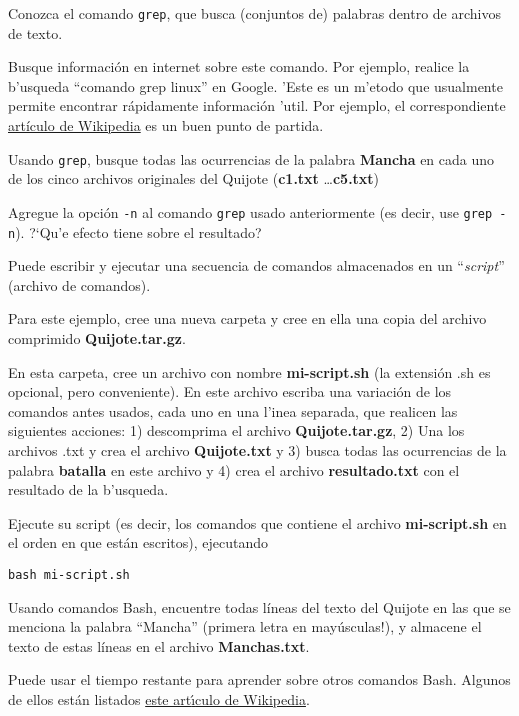 \documentclass[11pt]{exam}
\begin{document}
\begin{questions}
\item Conozca el comando \texttt{grep}, que busca (conjuntos de) palabras dentro de archivos de texto. 
\begin{parts}
\item Busque información en internet sobre este comando. Por ejemplo, realice la b'usqueda ``comando grep linux'' en Google. 'Este es un m'etodo que usualmente permite encontrar rápidamente información 'util. Por ejemplo, el correspondiente \href{https://es.wikipedia.org/wiki/Grep}{artículo de Wikipedia} es un buen punto de partida.

\item Usando \texttt{grep}, busque todas las ocurrencias de la palabra \textbf{Mancha} en cada uno de los cinco archivos originales del Quijote (\textbf{c1.txt} \dots \textbf{c5.txt})

\item Agregue la opción \texttt{-n} al comando \texttt{grep} usado anteriormente (es decir, use \texttt{grep -n}). ?`Qu'e efecto tiene sobre el resultado?
\end{parts}

\item Puede escribir y ejecutar una secuencia de comandos almacenados en un ``\textit{script}'' (archivo de comandos).
\begin{parts}
\item Para este ejemplo, cree una nueva carpeta y cree en ella una copia del archivo comprimido \textbf{Quijote.tar.gz}.

\item En esta carpeta, cree un archivo con nombre \textbf{mi-script.sh} (la extensión .sh es opcional, pero conveniente). En este archivo escriba una variación de los  comandos antes usados, cada uno en una l'inea separada, que realicen las siguientes acciones: 1) descomprima el archivo \textbf{Quijote.tar.gz}, 2) Una los archivos .txt y crea el archivo \textbf{Quijote.txt} y 3) busca todas las ocurrencias de la palabra \textbf{batalla} en este archivo y 4) crea el archivo \textbf{resultado.txt} con el resultado de la b'usqueda.

\item Ejecute su script (es decir, los comandos que contiene el archivo \textbf{mi-script.sh} en el orden en que están escritos), ejecutando 

\begin{verbatim}
bash mi-script.sh
\end{verbatim}
\end{parts}


\item Usando comandos Bash, encuentre todas líneas del texto del Quijote en las que se menciona la palabra ``Mancha'' (primera letra en mayúsculas!), y almacene el texto de estas líneas en el archivo \textbf{Manchas.txt}.


\item Puede usar el tiempo restante para aprender sobre otros comandos Bash. Algunos de ellos están listados \href{https://es.wikipedia.org/wiki/Comandos_Bash}{este art{\'\i}culo de Wikipedia}.


\end{questions}
\end{document}
